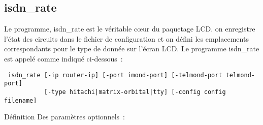 \subsection{isdn\_rate}

 Le programme, \flqq{}isdn\_rate\frqq{} est le véritable c\oe{}ur du paquetage LCD.
 on enregistre l'état des circuits dans le fichier de configuration et on défini
 les emplacements correspondants pour le type de donnée sur l'écran LCD. Le
 programme isdn\_rate est appelé comme indiqué ci-dessous~:

\begin{example}
\begin{verbatim}
 isdn_rate [-ip router-ip] [-port imond-port] [-telmond-port telmond-port]
           [-type hitachi|matrix-orbital|tty] [-config config filename]
\end{verbatim}
\end{example}

 Définition Des paramètres optionnels~: 

